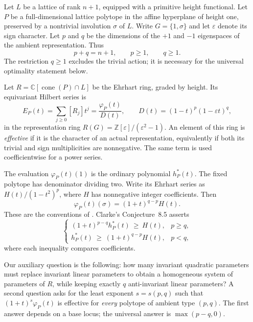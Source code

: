 \documentclass[11pt,a4paper]{article}
\theoremstyle{definition}
\theoremstyle{remark}\newtheorem{remark}[lemma]{Remark}
\begin{document}
Let $L$ be a lattice of rank $n+1$, equipped with a primitive height
functional. Let $P$ be a full-dimensional lattice polytope in the affine
hyperplane of height one, preserved by a nontrivial involution $\sigma$ of
$L$. Write $G=\{1,\sigma\}$ and let $\varepsilon$ denote its sign character.
Let $p$ and $q$ be the dimensions of the $+1$ and $-1$ eigenspaces of the
ambient representation. Thus
\[
 p+q=n+1,\qquad p\geq1,\qquad q\geq1.
\]
The restriction $q\geq1$ excludes the trivial action; it is necessary for
the universal optimality statement below.

Let $R=\mathbb C[\operatorname{cone}(P)\cap L]$ be the Ehrhart ring, graded
by height. Its equivariant Hilbert series is
\[
 E_P(t)=\sum_{j\geq0}[R_j]t^j
       =\frac{\varphi_P(t)}{D(t)},\qquad
 D(t)=(1-t)^p(1-\varepsilon t)^q,
\]
in the representation ring $R(G)=\mathbb Z[\varepsilon]/(\varepsilon^2-1)$.
An element of this ring is \emph{effective} if it is the character of an
actual representation, equivalently if both its trivial and sign
multiplicities are nonnegative. The same term is used coefficientwise for
a power series.

The evaluation $\varphi_P(t)(1)$ is the ordinary polynomial $h^*_P(t)$.
The fixed polytope has denominator dividing two. Write its Ehrhart series
as $H(t)/(1-t^2)^p$, where $H$ has nonnegative integer coefficients. Then
\begin{equation}\label{eq:ehrhart-fixed-numerator}
 \varphi_P(t)(\sigma)=(1+t)^{q-p}H(t).
\end{equation}
These are the conventions of \cite[Section~2 and Lemma~8.1]{Clarke26}.
Clarke's Conjecture~8.5 asserts
\begin{equation}\label{eq:clarke-target}
 \begin{cases}
 (1+t)^{p-q}h^*_P(t)\ \geq\ H(t),&p\geq q,\\
 h^*_P(t)\ \geq\ (1+t)^{q-p}H(t),&p<q,
 \end{cases}
\end{equation}
where each inequality compares coefficients.

Our auxiliary question is the following: how many invariant quadratic
parameters must replace invariant linear parameters to obtain a
homogeneous system of parameters of $R$, while keeping exactly $q$
anti-invariant linear parameters? A second question asks for the least
exponent $s=s(p,q)$ such that $(1+t)^s\varphi_P(t)$ is effective for
\emph{every} polytope of ambient type $(p,q)$. The first answer depends on
a base locus; the universal answer is $\max(p-q,0)$.
\end{document}
